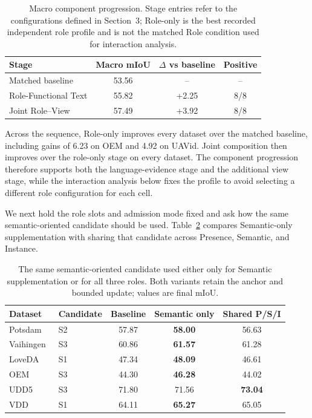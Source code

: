 \begin{table}[!htbp]
\centering
\caption{Macro component progression. Stage entries refer to the configurations defined in Section~3; Role-only is the best recorded independent role profile and is not the matched Role condition used for interaction analysis.}
\label{tab:component-progression}
\small
\setlength{\tabcolsep}{3pt}
\begin{tabular}{lccc}
\toprule
Stage & Macro mIoU & $\Delta$ vs baseline & Positive \\
\midrule
Matched baseline & 53.56 & -- & -- \\
Role-Functional Text & 55.82 & +2.25 & 8/8 \\
Joint Role--View & 57.49 & +3.92 & 8/8 \\
\bottomrule
\end{tabular}
\end{table}

Across the sequence, Role-only improves every dataset over the matched baseline, including gains of 6.23 on OEM and 4.92 on UAVid. Joint composition then improves over the role-only stage on every dataset. The component progression therefore supports both the language-evidence stage and the additional view stage, while the interaction analysis below fixes the profile to avoid selecting a different role configuration for each cell.

We next hold the role slots and admission mode fixed and ask how the same semantic-oriented candidate should be used. Table~\ref{tab:role-use} compares Semantic-only supplementation with sharing that candidate across Presence, Semantic, and Instance.

\begin{table}[!htbp]
\centering
\caption{The same semantic-oriented candidate used either only for Semantic supplementation or for all three roles. Both variants retain the anchor and bounded update; values are final mIoU.}
\label{tab:role-use}
\footnotesize
\setlength{\tabcolsep}{2pt}
\begin{tabular}{llccc}
\toprule
Dataset & Candidate & Baseline & Semantic only & Shared P/S/I \\
\midrule
Potsdam~\cite{R42} & S2 & 57.87 & \textbf{58.00} & 56.63 \\
Vaihingen~\cite{R42} & S3 & 60.86 & \textbf{61.57} & 61.28 \\
LoveDA~\cite{R36} & S1 & 47.34 & \textbf{48.09} & 46.61 \\
OEM~\cite{R38} & S3 & 44.30 & \textbf{46.28} & 44.02 \\
UDD5~\cite{R40} & S3 & 71.80 & 71.56 & \textbf{73.04} \\
VDD~\cite{R41} & S1 & 64.11 & \textbf{65.27} & 65.05 \\
\bottomrule
\end{tabular}
\end{table}

